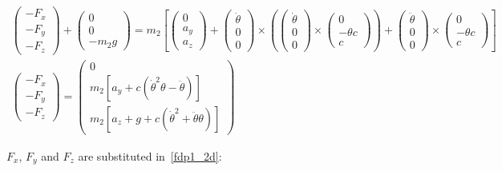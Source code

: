 \documentclass[a4paper, 11pt]{article}
\begin{document}
\begin{gather*}
  \begin{pmatrix}
  - F_x \\
  - F_y \\
  - F_z
  \end{pmatrix}
  +
  \begin{pmatrix}
  0 \\
  0 \\
  -m_2 g
  \end{pmatrix}
  = m_2
  \left[
  \begin{pmatrix}
  0 \\
  a_y \\
  a_z
  \end{pmatrix}
  +
  \begin{pmatrix}
  \dot{\theta} \\
  0 \\
  0
  \end{pmatrix}
  \times
  \left(
  \begin{pmatrix}
  \dot{\theta} \\
  0 \\
  0
  \end{pmatrix}
  \times
  \begin{pmatrix}
  0 \\
  -\theta c \\
  c
  \end{pmatrix}
  \right)
  +
  \begin{pmatrix}
  \ddot{\theta} \\
  0 \\
  0
  \end{pmatrix}
  \times
  \begin{pmatrix}
  0 \\
  -\theta c \\
  c
  \end{pmatrix}
  \right] \\
  \begin{pmatrix}
  - F_x \\
  - F_y \\
  - F_z
  \end{pmatrix}
  =
  \begin{pmatrix}
  0 \\
  m_2 [a_y + c (\dot{\theta}^2 \theta - \ddot{\theta})] \\
  m_2 [a_z + g + c (\dot{\theta}^2 + \ddot{\theta} \theta)]
  \end{pmatrix}
\end{gather*}


$F_x$, $F_y$ and $F_z$ are substituted in~\eqref{fdp1_2d}:
\end{document}
